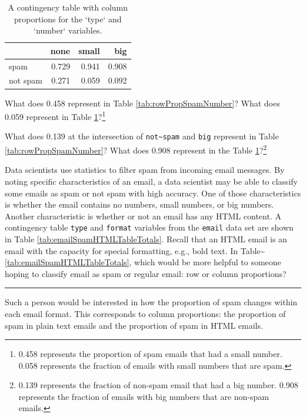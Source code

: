 \documentclass[
  10pt,
  openany]{book}
\theoremstyle{definition}
\theoremstyle{definition}
\theoremstyle{definition}
\theoremstyle{definition}
\theoremstyle{remark}
\begin{document}
\begin{table}
\centering
\caption{\label{tab:colPropSpamNumber}A contingency table with column proportions for the `type` and `number` variables.}
\centering
\begin{tabular}[t]{l|r|r|r}
\hline
  & none & small & big\\
\hline
spam & 0.729 & 0.941 & 0.908\\
\hline
not spam & 0.271 & 0.059 & 0.092\\
\hline
\end{tabular}
\end{table}

What does 0.458 represent in Table \ref{tab:rowPropSpamNumber}? What does 0.059 represent in Table \ref{tab:colPropSpamNumber}?\footnote{0.458 represents the proportion of spam emails that had a small number. 0.058 represents the fraction of emails with small numbers that are spam.}

What does 0.139 at the intersection of \texttt{not\textasciitilde{}spam} and \texttt{big} represent in Table \ref{tab:rowPropSpamNumber}? What does 0.908 represent in the Table \ref{tab:colPropSpamNumber}?\footnote{0.139 represents the fraction of non-spam email that had a big number. 0.908 represents the fraction of emails with big numbers that are non-spam emails.}

Data scientists use statistics to filter spam from incoming email messages. By noting specific characteristics of an email, a data scientist may be able to classify some emails as spam or not spam with high accuracy.
One of those characteristics is whether the email contains no numbers, small numbers, or big numbers. Another characteristic is whether or not an email has any HTML content. A contingency table \texttt{type} and \texttt{format} variables from the \texttt{email} data set are shown in Table \ref{tab:emailSpamHTMLTableTotals}. Recall that an HTML email is an email with the capacity for special formatting, e.g., bold text. In Table\textasciitilde{} \ref{tab:emailSpamHTMLTableTotals}, which would be more helpful to someone hoping to classify email as spam or regular email: row or column proportions?

\begin{center}\rule{0.5\linewidth}{0.5pt}\end{center}

Such a person would be interested in how the proportion of spam changes within each email format. This corresponds to column proportions: the proportion of spam in plain text emails and the proportion of spam in HTML emails.
\end{document}
